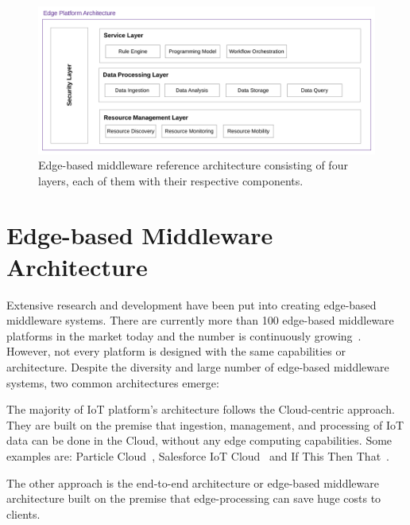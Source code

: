 \begin{figure}[hbt!]
    \centering
    \includegraphics[scale=0.7]{Figures/IoTArchW.pdf}
    \caption{Edge-based middleware reference architecture consisting of four layers, each of them with their respective components.}
    \label{fig:EdgeArch}
\end{figure}

\section{Edge-based Middleware Architecture}\label{sec:arch}

Extensive research and development have been put into creating edge-based middleware systems. There are currently more than 100 edge-based middleware platforms in the market today and the number is continuously growing~\cite{List}. However, not every platform is designed with the same capabilities or architecture. Despite the diversity and large number of edge-based middleware systems, two common architectures emerge:

The majority of IoT platform's architecture follows the Cloud-centric approach. They are built on the premise that ingestion, management, and processing of IoT data can be done in the Cloud, without any edge computing capabilities. Some examples are: Particle Cloud~\cite{Particle}, Salesforce IoT Cloud~\cite{Salesforce_IoT_Cloud} and If This Then That~\cite{IFTTT}.

The other approach is the end-to-end architecture or edge-based middleware architecture built on the premise that edge-processing can save huge costs to clients. %

